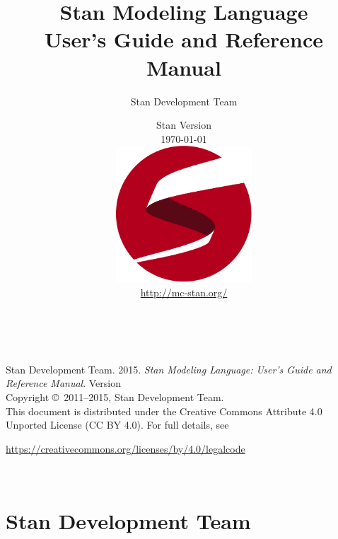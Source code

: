 \title{\Huge\bf Stan Modeling Language \\[4pt] {\LARGE User's Guide
    and Reference Manual}}
\author{Stan Development Team}

\date{\vspace*{36pt} Stan Version \stanversion
\\[8pt] {\small \today}
\\[36pt]
{
\vfill
\includegraphics[width=2in]{img/stanlogo-main.pdf}}
\\
\vspace*{6pt}
{\small \url{http://mc-stan.org/}}
}
\maketitle

\newpage
\thispagestyle{empty}
\mbox{ }
\vfill
\begin{center}
\begin{minipage}[t]{0.75\textwidth}
\small
Stan Development Team. 2015.  
{\it Stan Modeling Language: User's Guide and Reference Manual}. Version
\stanversion
\vspace*{20pt}
\mbox{ }
\\
Copyright \copyright \ 2011--2015, Stan Development Team.
\vspace*{28pt}
\mbox{} \\
This document is distributed under the Creative Commons Attribute 4.0
Unported License (CC BY 4.0).  For full details, see
\begin{center}
\url{https://creativecommons.org/licenses/by/4.0/legalcode} 
\end{center}
\end{minipage}
\vspace*{24pt}
\mbox{ }
\end{center}

\newpage
\section*{Stan Development Team}

